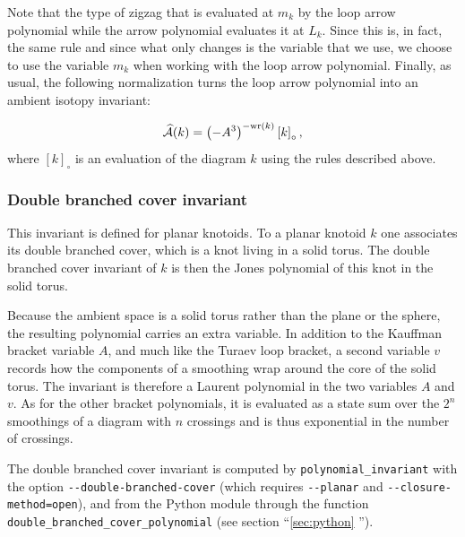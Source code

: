 Note that the type of zigzag that is evaluated at $m_k$ by the loop arrow polynomial while the arrow polynomial evaluates it at $L_k$. Since this is, in fact, the same rule and since what only changes is the variable that we use, we choose to use the variable $m_k$ when working with the loop arrow polynomial. Finally, as usual, the following normalization turns the loop arrow polynomial into an ambient isotopy invariant:

\begin{equation}\label{eq:arrow}
\widehat{\mathcal{A}}(k) = \left( - A^3 \right )^{-{\rm wr}(k)} \left [ k \right ]_{\circ},
\end{equation}
where $ \left [ k  \right ]_{\circ}$ is an evaluation of the diagram $k$ using the rules described above.



\subsubsection{\label{sec:theory:jones:dbc}Double branched cover invariant}
This invariant is defined for planar knotoids. To a planar knotoid $k$ one associates its double branched cover, which is a knot living in a solid torus. The double branched cover invariant of $k$ is then the Jones polynomial of this knot in the solid torus.

Because the ambient space is a solid torus rather than the plane or the sphere, the resulting polynomial carries an extra variable. In addition to the Kauffman bracket variable $A$, and much like the Turaev loop bracket, a second variable $v$ records how the components of a smoothing wrap around the core of the solid torus. The invariant is therefore a Laurent polynomial in the two variables $A$ and $v$. As for the other bracket polynomials, it is evaluated as a state sum over the $2^n$ smoothings of a diagram with $n$ crossings and is thus exponential in the number of crossings.

The double branched cover invariant is computed by \lstinline{polynomial_invariant} with the option \lstinline{--double-branched-cover} (which requires \lstinline{--planar} and \lstinline{--closure-method=open}), and from the Python module through the function \lstinline{double_branched_cover_polynomial} (see section ``\ref{sec:python} '').

